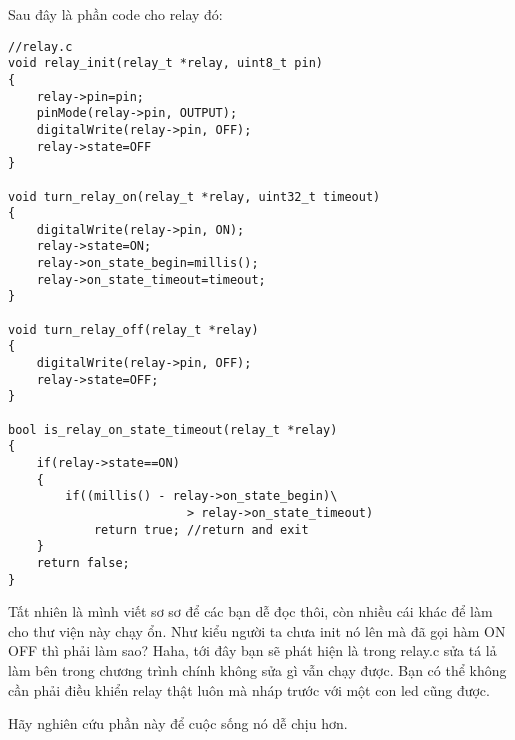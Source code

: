 Sau đây là phần code cho relay đó:
\begin{lstlisting}
//relay.c
void relay_init(relay_t *relay, uint8_t pin)
{
	relay->pin=pin;
	pinMode(relay->pin, OUTPUT);
	digitalWrite(relay->pin, OFF);
	relay->state=OFF
}

void turn_relay_on(relay_t *relay, uint32_t timeout)
{
	digitalWrite(relay->pin, ON);
	relay->state=ON;
	relay->on_state_begin=millis();
	relay->on_state_timeout=timeout;
}

void turn_relay_off(relay_t *relay)
{
	digitalWrite(relay->pin, OFF);
	relay->state=OFF;
}

bool is_relay_on_state_timeout(relay_t *relay)
{
	if(relay->state==ON) 
	{
		if((millis() - relay->on_state_begin)\
						 > relay->on_state_timeout)
			return true; //return and exit
	}
	return false;
}

\end{lstlisting}

Tất nhiên là mình viết sơ sơ để các bạn dễ đọc thôi, còn nhiều cái khác để làm cho thư viện này chạy ổn. Như kiểu người ta chưa init nó lên mà đã gọi hàm ON OFF thì phải làm sao? Haha, tới đây bạn sẽ phát hiện là trong relay.c sửa tá lả làm bên trong chương trình chính không sửa gì vẫn chạy được. Bạn có thể không cần phải điều khiển relay thật luôn mà nháp trước với một con led cũng được.

Hãy nghiên cứu phần này để cuộc sống nó dễ chịu hơn.